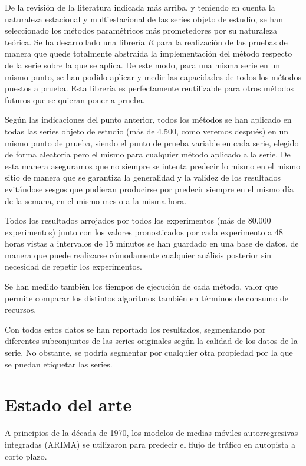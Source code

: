 \documentclass[]{book}
\begin{document}
De la revisión de la literatura indicada más arriba, y teniendo en
cuenta la naturaleza estacional y multiestacional de las series objeto
de estudio, se han seleccionado los métodos paramétricos más
prometedores por su naturaleza teórica. Se ha desarrollado una librería
\emph{R} para la realización de las pruebas de manera que quede
totalmente abstraída la implementación del método respecto de la serie
sobre la que se aplica. De este modo, para una misma serie en un mismo
punto, se han podido aplicar y medir las capacidades de todos los
métodos puestos a prueba. Esta librería es perfectamente reutilizable
para otros métodos futuros que se quieran poner a prueba.

Según las indicaciones del punto anterior, todos los métodos se han
aplicado en todas las series objeto de estudio (más de 4.500, como
veremos después) en un mismo punto de prueba, siendo el punto de prueba
variable en cada serie, elegido de forma aleatoria pero el mismo para
cualquier método aplicado a la serie. De esta manera aseguramos que no
siempre se intenta predecir lo mismo en el mismo sitio de manera que se
garantiza la generalidad y la validez de los resultados evitándose
sesgos que pudieran producirse por predecir siempre en el mismo día de
la semana, en el mismo mes o a la misma hora.

Todos los resultados arrojados por todos los experimentos (más de 80.000
experimentos) junto con los valores pronosticados por cada experimento a
48 horas vistas a intervalos de 15 minutos se han guardado en una base
de datos, de manera que puede realizarse cómodamente cualquier análisis
posterior sin necesidad de repetir los experimentos.

Se han medido también los tiempos de ejecución de cada método, valor que
permite comparar los distintos algoritmos también en términos de consumo
de recursos.

Con todos estos datos se han reportado los resultados, segmentando por
diferentes subconjuntos de las series originales según la calidad de los
datos de la serie. No obstante, se podría segmentar por cualquier otra
propiedad por la que se puedan etiquetar las series.

\chapter{Estado del arte}\label{estado-del-arte}


A principios de la década de 1970, los modelos de medias móviles
autorregresivas integradas (ARIMA) se utilizaron para predecir el flujo
de tráfico en autopista a corto plazo.
\end{document}
